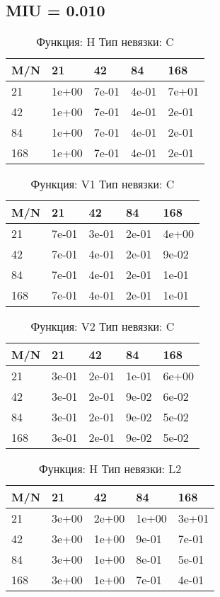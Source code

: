 \documentclass[a4paper,11pt]{article}
\begin{document}
\subsection{MIU = 0.010}
\begin{table}[H]
\caption {Функция: H Тип невязки: C   }
\begin{center}
\begin{tabular}{l|l|l|l|l}
\hline
M/N  & 21 & 42 & 84 & 168 \\ \hline
  21 & 1e+00& 7e-01& 4e-01& 7e+01\\ \hline
  42 & 1e+00& 7e-01& 4e-01& 2e-01\\ \hline
  84 & 1e+00& 7e-01& 4e-01& 2e-01\\ \hline
 168 & 1e+00& 7e-01& 4e-01& 2e-01\\ \hline
\end{tabular}
\end{center}
\end{table}
\begin{table}[H]
\caption {Функция: V1 Тип невязки: C   }
\begin{center}
\begin{tabular}{l|l|l|l|l}
\hline
M/N  & 21 & 42 & 84 & 168 \\ \hline
  21 & 7e-01& 3e-01& 2e-01& 4e+00\\ \hline
  42 & 7e-01& 4e-01& 2e-01& 9e-02\\ \hline
  84 & 7e-01& 4e-01& 2e-01& 1e-01\\ \hline
 168 & 7e-01& 4e-01& 2e-01& 1e-01\\ \hline
\end{tabular}
\end{center}
\end{table}
\begin{table}[H]
\caption {Функция: V2 Тип невязки: C   }
\begin{center}
\begin{tabular}{l|l|l|l|l}
\hline
M/N  & 21 & 42 & 84 & 168 \\ \hline
  21 & 3e-01& 2e-01& 1e-01& 6e+00\\ \hline
  42 & 3e-01& 2e-01& 9e-02& 6e-02\\ \hline
  84 & 3e-01& 2e-01& 9e-02& 5e-02\\ \hline
 168 & 3e-01& 2e-01& 9e-02& 5e-02\\ \hline
\end{tabular}
\end{center}
\end{table}
\begin{table}[H]
\caption {Функция: H Тип невязки: L2  }
\begin{center}
\begin{tabular}{l|l|l|l|l}
\hline
M/N  & 21 & 42 & 84 & 168 \\ \hline
  21 & 3e+00& 2e+00& 1e+00& 3e+01\\ \hline
  42 & 3e+00& 1e+00& 9e-01& 7e-01\\ \hline
  84 & 3e+00& 1e+00& 8e-01& 5e-01\\ \hline
 168 & 3e+00& 1e+00& 7e-01& 4e-01\\ \hline
\end{tabular}
\end{center}
\end{table}
\end{document}

